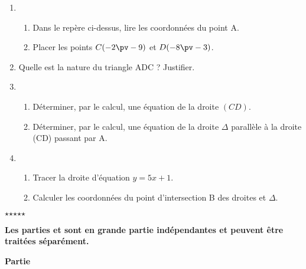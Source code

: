 \documentclass[10pt,french]{article}
\begin{document}
\begin{enumerate}[label=\arabic*.]
\item 	\begin{enumerate}[label=\alph*)]
	\item Dans le repère ci-dessus, lire les coordonnées du point A.
	
	\item Placer les points $C(-2\pv -9)$ et $D(-8\pv -3)$.
	\end{enumerate}
	
\item Quelle est la nature du triangle ADC ? Justifier.

\item\begin{enumerate}[label=\alph*)]
	\item Déterminer, par le calcul, une équation de la droite $(CD)$.
	
	\item Déterminer, par le calcul, une équation de la droite $\Delta$ parallèle à la droite (CD) passant par A.
			
	\end{enumerate}

\item \begin{enumerate}[label=\alph*)]
	\item Tracer la droite  d'équation $y=5x+1$.
	
	\item Calculer les coordonnées du point d'intersection B des droites  et $\Delta$.	
		
	\end{enumerate}	

\end{enumerate}

\begin{center}
$\star$\quad $\star$\quad $\star$\quad $\star$\quad $\star$
\end{center}


\exercice
\bigskip

\textbf{Les parties  et  sont en grande partie indépendantes et peuvent être traitées séparément.}

\medskip
\textbf{Partie} 
\end{document}
